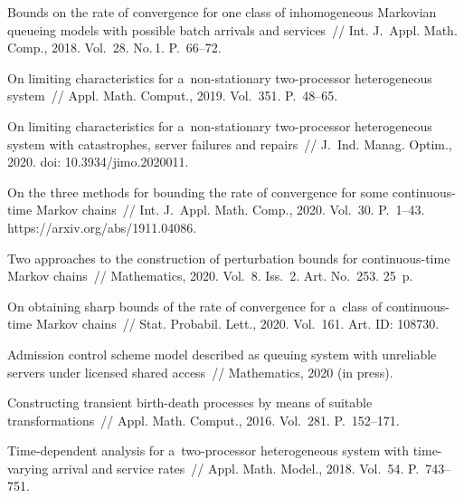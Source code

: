 \begin{multicols}{2}
{{\begin{thebibliography}{99}
Bounds on the rate of convergence for one class of inhomogeneous 
{M}arkovian queueing
models with possible batch arrivals and services~// Int.
J.~Appl. Math. Comp., 2018. Vol.~28.
No.\,1. P.~66--72.

On limiting characteristics for a~non-stationary two-processor
heterogeneous system~// Appl. Math. Comput., 2019.
Vol.~351. P.~48--65.

On limiting characteristics for a~non-stationary two-processor
heterogeneous system with catastrophes, server failures and repairs~// 
J.~Ind. Manag. Optim., 2020. 
doi: 10.3934/jimo.2020011.

 On the three methods for bounding the rate of
convergence for some continuous-time Markov chains~// Int.
J.~Appl. Math. Comp., 2020. Vol.~30.
P.~1--43. 
{\sf https://arxiv.org/abs/1911.04086}.


 Two approaches to the
construction of perturbation bounds for continuous-time Markov
chains~// Mathematics, 2020. Vol.~8. Iss.~2. Art. No.~253. 25~p.


 On obtaining
sharp bounds of the rate of convergence for a~class of
continuous-time Markov chains~// Stat. Probabil. Lett.,
2020. Vol.~161. Art. ID: 108730.



Admission control scheme model described as queuing system with
unreliable servers under licensed shared access~// Mathematics,
 2020 (in press).


Constructing transient birth-death processes by means of suitable
transformations~// Appl. Math. Comput., 2016. Vol.~281. P.~152--171.

 Time-dependent
analysis for a~two-processor heterogeneous system with time-varying
arrival and service rates~// Appl. Math. Model., 2018. 
Vol.~54. P.~743--751.


\end{thebibliography}}}
\end{multicols}

